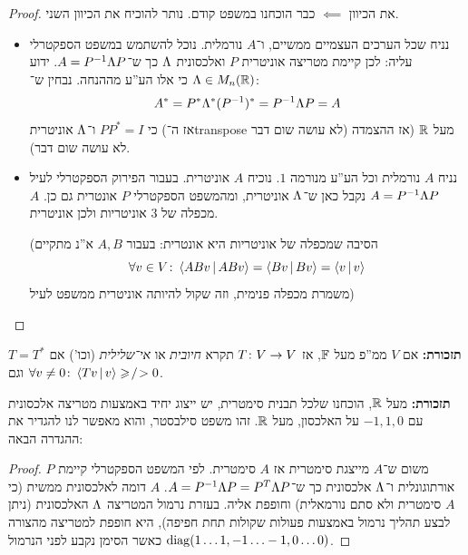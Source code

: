 \documentclass[name=רשימות אלגברה לינארית 2א]{../../../tex/classes/megasumPreamble}
\begin{document}
	\begin{proof}
		את הכיוון $\impliedby$ כבר הוכחנו במשפט קודם. נותר להוכיח את הכיוון השני. 
		\begin{itemize}
			\item נניח שכל הערכים העצמיים ממשיים, ו־$A$ נורמלית. נוכל להשתמש במשפט הספקטרלי עליה: לכן קיימת מטריצה אוניטרית $P$ ואלכסונית $\Lambda$ כך ש־$A = P^{-1} \Lambda P$. ידוע $\Lambda \in M_n(\mathbb{R})$ כי אלו הע''ע מההנחה. נבחין ש־: 
			\[ A^* = P^* \Lambda^* (P^{-1})^* = P^{-1} \Lambda P = A \]
			כי $PP^* =I$ ו־$\Lambda$ אוניטרית (אז ה־transpose לא עושה שום דבר) מעל $\mathbb{R}$ (אז ההצמדה לא עושה שום דבר). 
			\item נניח $A$ נורמלית וכל הע''ע מנורמה $1$. נוכיח $A$ אוניטרית. בעבור הפירוק הספקטרלי לעיל $A = P^{-1} \Lambda P$ נקבל כאן ש־$\Lambda$ אוניטרית, ומהמשפט הספקטרלי $P$ אונטרית גם כן. $A$ מכפלה של 3 אוניטריות ולכן אוניטרית. 
			
			(הסיבה שמכפלה של אוניטריות היא אונטרית: בעבור $A, B$ א''נ מתקיים
			\[ \forall v \in V \colon \left \langle ABv \,\middle|\, ABv \right \rangle = \left \langle Bv \,\middle|\, Bv \right \rangle = \left \langle v \,\middle|\, v \right \rangle \]
			משמרת מכפלה פנימית, וזה שקול להיותה אוניטרית ממשפט לעיל)
		\end{itemize}
		\envendproof
	\end{proof}
	
	\textbf{תזכורת: }אם $V$ ממ''פ מעל $\mathbb{F}$, אז $T \colon V \to V$ תקרא \textit{חיובית} או \textit{אי־שלילית} (וכו') אם $T = T^*$ וגם $\forall v \neq 0 \colon \left \langle Tv \,\middle|\, v \right \rangle \geqslant\!/\!> 0$. 
	
	\textbf{תזכורת: }מעל $\mathbb{R}$, הוכחנו שלכל תבנית סימטרית, יש ייצוג יחיד באמצעות מטריצה אלכסונית עם $-1, 1, 0$ על האלכסון, מעל $\mathbb{R}$. זהו משפט סילבסטר, והוא מאפשר לנו להגדיר את ההגדרה הבאה: 
	
	
	\begin{proof}
		משום ש־$A$ מייצגת סימטרית אז $A$ סימטרית. לפי המשפט הספקטרלי קיימת $P$ אורתוגונלית ו־$\Lambda$ אלכסונית כך ש־$A = P^{-1}\Lambda P = P^T\Lambda P$. $A$ דומה לאלכסונית ממשית (כי $A$ סימטרית ולא סתם נורמאלית) וחופפת אליה. בעזרת נרמול המטריצה $\Lambda$ האלכסונית (ניתן לבצע תהליך נרמול באמצעות פעולות שקולות תחת חפיפה), היא חופפת למטריצה מהצורה $\operatorname{diag}(1 \dots 1, -1 \ldots -1, 0 \ldots 0)$ כאשר הסימן נקבע לפני הנרמול. 
	\end{proof}
	
\end{document}
